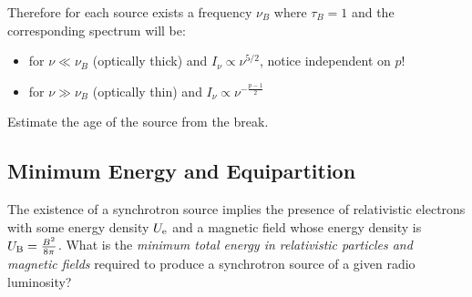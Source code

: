 Therefore for each source exists a frequency $\nu_B$ where $\tau_B = 1$ and the corresponding spectrum will be:
%
\begin{itemize}
\item for $\nu \ll \nu_B$ (optically thick) and $I_\nu \propto \nu^{5/2}$, notice independent on $p$!

\item for $\nu \gg \nu_B$ (optically thin) and $I_\nu \propto \nu^{-\frac{p-1}{2}}$
\end{itemize}


\begin{problem} Estimate the age of the source from the break.
\end{problem}




\subsection{Minimum Energy and Equipartition}

The existence of a synchrotron source implies the presence of relativistic electrons with some energy density $U_{\rm e}$ and a magnetic field whose energy density is $U_{\rm B} = \frac{B^2}{8\pi}$. 
%
What is the \emph{minimum total energy in relativistic particles and magnetic fields} required to produce a synchrotron source of a given radio luminosity?

